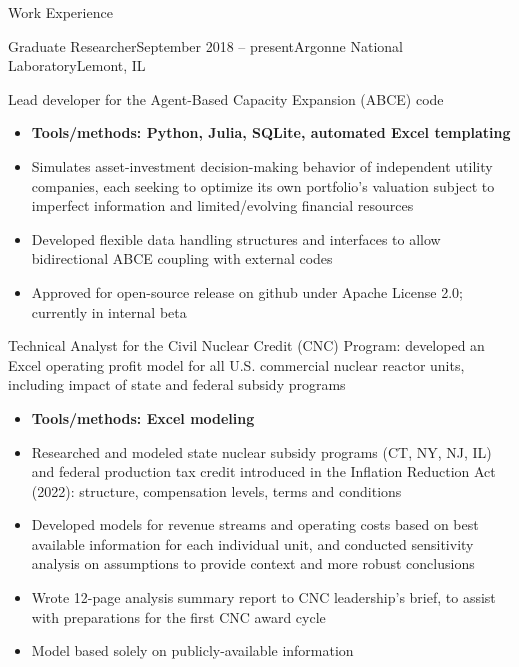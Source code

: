 \documentclass{resume} %
\begin{document}

\begin{rSection}{Work Experience}

\begin{rSubsection}{Graduate Researcher}{September 2018 -- present}{Argonne National Laboratory}{Lemont, IL}
  \item Lead developer for the Agent-Based Capacity Expansion (ABCE) code
    \begin{itemize}
      \setlength{\itemsep}{-3pt}
      \item \textbf{Tools/methods: Python, Julia, SQLite, automated Excel templating}
      \item Simulates asset-investment decision-making behavior of independent utility companies, each seeking to optimize its own portfolio's valuation subject to imperfect information and limited/evolving financial resources
      \item Developed flexible data handling structures and interfaces to allow bidirectional ABCE coupling with external codes
      \item Approved for open-source release on github under Apache License 2.0; currently in internal beta
    \end{itemize}

  \item Technical Analyst for the Civil Nuclear Credit (CNC) Program: developed an Excel operating profit model for all U.S. commercial nuclear reactor units, including impact of state and federal subsidy programs
  \begin{itemize}
    \setlength{\itemsep}{-3pt}
    \item \textbf{Tools/methods: Excel modeling}
    \item Researched and modeled state nuclear subsidy programs (CT, NY, NJ, IL) and federal production tax credit introduced in the Inflation Reduction Act (2022): structure, compensation levels, terms and conditions
    \item Developed models for revenue streams and operating costs based on best available information for each individual unit, and conducted sensitivity analysis on assumptions to provide context and more robust conclusions
    \item Wrote 12-page analysis summary report to CNC leadership's brief, to assist with preparations for the first CNC award cycle
    \item Model based solely on publicly-available information
  \end{itemize}


\end{rSubsection}
\end{rSection}
\end{document}
